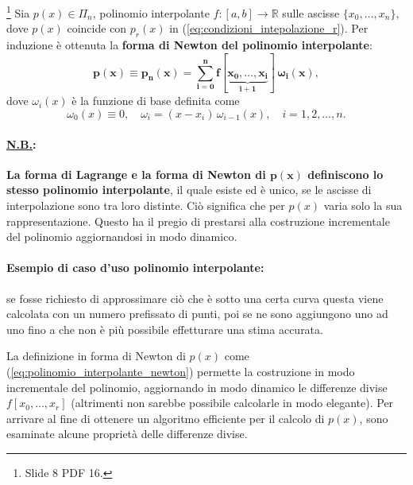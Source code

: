 \begin{remark}\label{rem:polinomio_interpolante_forma_newton}\footnote{Slide 8 PDF 16.}
    Sia $p(x)\in\Pi_n$, polinomio interpolante $f:[a,b]\rightarrow\mathbb{R}$ sulle ascisse $\{x_0,\hdots, x_n\}$, dove $p(x)$ coincide con $p_r(x)$ in (\ref{eq:condizioni_intepolazione_r}).
    Per induzione è ottenuta la \textbf{forma di Newton del polinomio interpolante}: 
    \begin{equation}\label{eq:polinomio_interpolante_newton}
        \boldsymbol{p(x)\equiv p_n(x) = \sum_{i=0}^{n} f[\underbrace{x_0,\hdots, x_i}_{i+1}]\,\omega_i(x)},
    \end{equation}
    dove $\omega_i(x)$ è la funzione di base definita come
    \begin{equation*}
    	\omega_0(x)\equiv 0, \quad \omega_i=(x-x_i)\,\omega_{i-1}(x),\quad i=1,2,\hdots, n.
    \end{equation*}
\end{remark}

\paragraph{\ul{N.B.}:} \textbf{La forma di Lagrange e la forma di Newton di $\boldsymbol{p(x)}$ definiscono lo stesso polinomio interpolante}, il quale esiste ed è unico, se le ascisse di interpolazione sono tra loro distinte. Ciò significa che per $p(x)$ varia solo la sua rappresentazione. Questo ha il pregio di prestarsi alla costruzione incrementale del polinomio aggiornandosi in modo dinamico.

\paragraph{Esempio di caso d'uso polinomio interpolante:} se fosse richiesto di approssimare ciò che è sotto una certa curva questa viene calcolata con un numero prefissato di punti, poi se ne sono aggiungono uno ad uno fino a che non è più possibile effetturare una stima accurata.

La definizione in forma di Newton di $p(x)$ come (\ref{eq:polinomio_interpolante_newton}) permette la costruzione in modo incrementale del polinomio, aggiornando in modo dinamico le differenze divise $f[x_0,\hdots, x_r]$ (altrimenti non sarebbe possibile calcolarle in modo elegante). Per arrivare al fine di ottenere un algoritmo efficiente per il calcolo di $p(x)$, sono esaminate alcune proprietà delle differenze divise.

